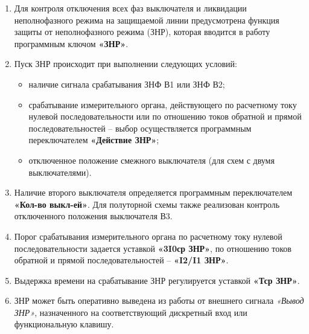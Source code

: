 
\color{black}

\begin{enumerate}[label=\arabic{section}.\arabic{subsection}.\arabic{enumi}, labelsep=4pt, leftmargin=0pt, itemindent=57pt, itemsep=0pt, parsep=0pt] %

\item
Для контроля отключения всех фаз выключателя и ликвидации неполнофазного режима на защищаемой линии предусмотрена функция защиты от неполнофазного режима (ЗНР), которая вводится в работу программным ключом \textbf{«ЗНР»}.

\item
Пуск ЗНР происходит при выполнении следующих условий:
\begin{itemize}
\item наличие сигнала срабатывания ЗНФ В1 или ЗНФ В2;
\item срабатывание измерительного органа, действующего по расчетному току нулевой последовательности или по отношению токов обратной и прямой последовательностей -- выбор осуществляется программным переключателем \textbf{«Действие ЗНР»};
\item отключенное положение смежного выключателя (для схем с двумя выключателями).
\end{itemize}

\item
Наличие второго выключателя определяется программным переключателем \textbf{«Кол-во выкл-ей»}. Для полуторной схемы также реализован контроль отключенного положения выключателя В3.

\item
Порог срабатывания измерительного органа по расчетному току нулевой последовательности задается уставкой \textbf{«3I0ср ЗНР»}, по отношению токов обратной и прямой последовательностей – \textbf{«I2/I1 ЗНР»}.

\item
Выдержка времени на срабатывание ЗНР регулируется уставкой \textbf{«Тср ЗНР»}. 

\item
ЗНР может быть оперативно выведена из работы от внешнего сигнала \textit{«Вывод ЗНР»}, назначенного на соответствующий дискретный вход или функциональную клавишу.


\end{enumerate}
